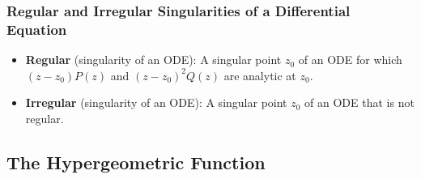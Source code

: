 \documentclass[../finalProject.tex]{subfiles}
\begin{document}
\subsubsection{Regular and Irregular Singularities of a Differential Equation}
\begin{itemize}
    \item \textbf{Regular} (singularity of an ODE): A singular point $z_0$ of an ODE for which $(z-z_0)P(z)$ and $(z-z_0)^2Q(z)$ are analytic at $z_0$.
    \item \textbf{Irregular} (singularity of an ODE): A singular point $z_0$ of an ODE that is not regular.
\end{itemize}


\subsection{The Hypergeometric Function}
\end{document}
